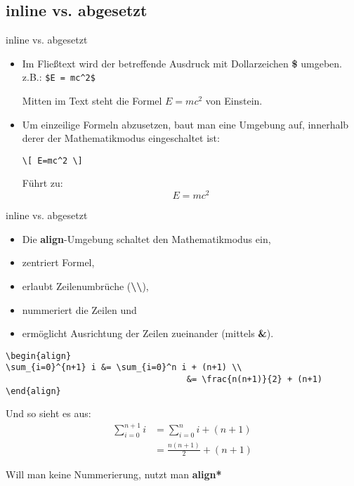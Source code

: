 \subsection{inline vs. abgesetzt}
\begin{frame}[fragile]{inline vs. abgesetzt}
\begin{itemize}
\item Im Fließtext wird der betreffende Ausdruck mit Dollarzeichen \textbf{\$} umgeben. z.B.: \verb|$E = mc^2$|

\vspace{0.5ex} Mitten im Text steht die Formel $E = mc^2$ von Einstein.\pause

\item Um einzeilige Formeln abzusetzen, baut man eine Umgebung auf, innerhalb derer der Mathematikmodus eingeschaltet ist:

\begin{lstlisting}[style=tex]
\[ E=mc^2 \]
\end{lstlisting}
Führt zu:
\[ E=mc^2 \]
\end{itemize}
\end{frame}

\begin{frame}[fragile]{inline vs. abgesetzt}
\begin{itemize}
\item Die \textbf{align}-Umgebung schaltet den Mathematikmodus ein,
\item zentriert Formel,
\item erlaubt Zeilenumbrüche (\textbf{\textbackslash\textbackslash}),
\item nummeriert die Zeilen und
\item ermöglicht Ausrichtung der Zeilen zueinander (mittels \textbf{\&}).
\end{itemize}

\begin{lstlisting}[style=tex]
\begin{align}
\sum_{i=0}^{n+1} i &= \sum_{i=0}^n i + (n+1) \\
                                    &= \frac{n(n+1)}{2} + (n+1)
\end{align}
\end{lstlisting}

\pause Und so sieht es aus:
\begin{align}
\sum_{i=0}^{n+1} i &= \sum_{i=0}^n i + (n+1) \\
                       &= \frac{n(n+1)}{2} + (n+1)
\end{align}\pause

Will man keine Nummerierung, nutzt man \textbf{align*}
\end{frame}

